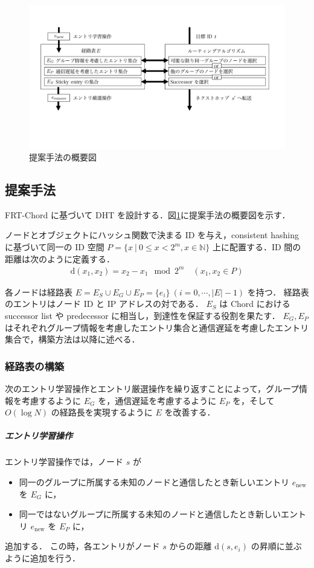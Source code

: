 \documentclass[10pt, a4paper, twocolumn]{jsarticle}
\begin{document}
\begin{figure}[h]
  \centering
  \includegraphics[width=120mm]{fig/str.pdf}
  \caption{提案手法の概要図}
  \label{fig:example}
\end{figure}

\subsection{提案手法}
FRT-Chord に基づいて DHT を設計する．図\ref{fig:example}に提案手法の概要図を示す．

ノードとオブジェクトにハッシュ関数で決まる ID を与え，consistent hashing に基づいて同一の ID 空間 $P = \{x\ |\ 0 \leq x < 2^m, x \in \mathbb{N}\}$ 上に配置する．ID 間の距離は次のように定義する．
\begin{align}
  \mathrm{d}(x_1, x_2) = x_2 - x_1 \mod 2^m \quad (x_1, x_2 \in P)
\end{align}

各ノードは経路表 $E = E_S \cup E_G \cup E_P = \{e_i\} \ (i = 0, \cdots, |E| - 1)$ を持つ．
経路表のエントリはノード ID と IP アドレスの対である．
$E_S$ は Chord における successor list や predecessor に相当し，到達性を保証する役割を果たす．
$E_G, E_P$ はそれぞれグループ情報を考慮したエントリ集合と通信遅延を考慮したエントリ集合で，構築方法は以降に述べる．

\subsubsection{経路表の構築}
次のエントリ学習操作とエントリ厳選操作を繰り返すことによって，グループ情報を考慮するように $E_G$ を，通信遅延を考慮するように $E_P$ を，そして $O(\log N)$ の経路長を実現するように $E$ を改善する．

\subparagraph{エントリ学習操作}
エントリ学習操作では，ノード $s$ が
\begin{itemize}
  \item 同一のグループに所属する未知のノードと通信したとき新しいエントリ $e_{\mathrm{new}}$ を $E_G$ に，
  \item 同一ではないグループに所属する未知のノードと通信したとき新しいエントリ $e_{\mathrm{new}}$ を $E_P$ に，
\end{itemize}
追加する．
この時，各エントリがノード $s$ からの距離 $\mathrm{d}(s, e_i)$ の昇順に並ぶように追加を行う．
\end{document}
